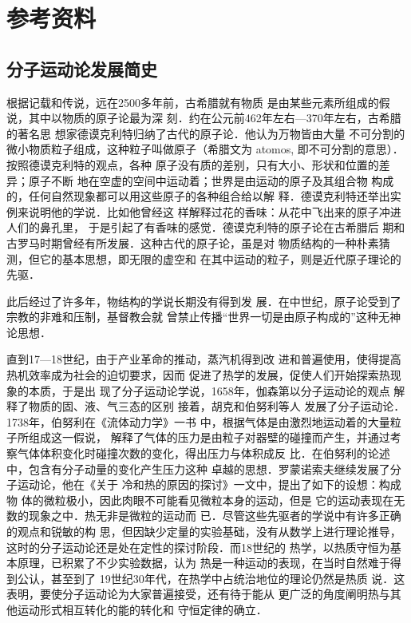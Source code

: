 \section{参考资料}

\subsection{分子运动论发展简史}

根据记载和传说，远在2500多年前，古希腊就有物质
是由某些元素所组成的假说，其中以物质的原子论最为深
刻．约在公元前462年左右—370年左右，古希腊的著名思
想家德谟克利特归纳了古代的原子论．他认为万物皆由大量
不可分割的微小物质粒子组成，这种粒子叫做原子（希腊文为
atomos, 即不可分割的意思）．按照德谟克利特的观点，各种
原子没有质的差别，只有大小、形状和位置的差异；原子不断
地在空虚的空间中运动着；世界是由运动的原子及其组合物
构成的，任何自然现象都可以用这些原子的各种组合给以解
释．德谟克利特还举出实例来说明他的学说．比如他曾经这
样解释过花的香味：从花中飞出来的原子冲进人们的鼻孔里，
于是引起了有香味的感觉．德谟克利特的原子论在古希腊后
期和古罗马时期曾经有所发展．这种古代的原子论，虽是对
物质结构的一种朴素猜测，但它的基本思想，即无限的虚空和
在其中运动的粒子，则是近代原子理论的先驱．

此后经过了许多年，物结构的学说长期没有得到发
展．在中世纪，原子论受到了宗教的非难和压制，基督教会就
曾禁止传播“世界一切是由原子构成的”这种无神论思想．

直到17—18世纪，由于产业革命的推动，蒸汽机得到改
进和普遍使用，使得提高热机效率成为社会的迫切要求，因而
促进了热学的发展，促使人们开始探索热现象的本质，于是出
现了分子运动论学说，1658年，伽森第以分子运动论的观点
解释了物质的固、液、气三态的区别 接着，胡克和伯努利等人
发展了分子运动论．1738年，伯努利在《流体动力学》一书
中，根据气体是由激烈地运动着的大量粒子所组成这一假说，
解释了气体的压力是由粒子对器壁的碰撞而产生，并通过考
察气体体积变化时碰撞次数的变化，得出压力与体积成反
比．在伯努利的论述中，包含有分子动量的变化产生压力这种
卓越的思想．罗蒙诺索夫继续发展了分子运动论，他在《关于
冷和热的原因的探讨》一文中，提出了如下的设想：构成物
体的微粒极小，因此肉眼不可能看见微粒本身的运动，但是
它的运动表现在无数的现象之中．热无非是微粒的运动而
已．尽管这些先驱者的学说中有许多正确的观点和锐敏的构
思，但因缺少定量的实验基础，没有从数学上进行理论推导，
这时的分子运动论还是处在定性的探讨阶段．而18世纪的
热学，以热质守恒为基本原理，已积累了不少实验数据，认为
热是一种运动的表现，在当时自然难于得到公认，甚至到了
19世纪30年代，在热学中占统治地位的理论仍然是热质
说．这表明，要使分子运动论为大家普遍接受，还有待于能从
更广泛的角度阐明热与其他运动形式相互转化的能的转化和
守恒定律的确立．


